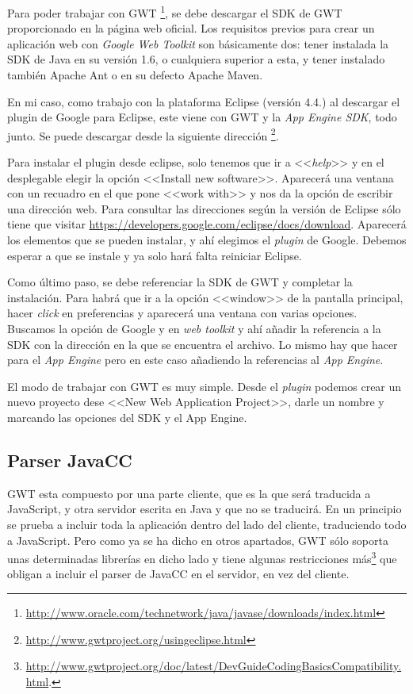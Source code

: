 Para poder trabajar con GWT \footnote{\url{http://www.oracle.com/technetwork/java/javase/downloads/index.html}}, se debe descargar el SDK de GWT proporcionado en la página web oficial. Los requisitos previos para crear un aplicación web con \emph{Google Web Toolkit} son básicamente dos: tener instalada la SDK de Java en su versión 1.6, o cualquiera superior a esta, y tener instalado también Apache Ant o en su defecto Apache Maven.

En mi caso, como trabajo con la plataforma Eclipse (versión 4.4.) al descargar el plugin de Google para Eclipse, este viene con GWT y la \emph{App Engine SDK}, todo junto. Se puede descargar desde la siguiente dirección \footnote{\url{http://www.gwtproject.org/usingeclipse.html}}.

Para instalar el plugin desde eclipse, solo tenemos que ir a <<\emph{help}>> y en el desplegable elegir la opción <<Install new software>>. Aparecerá una ventana con un recuadro en el que pone <<work with>> y nos da la opción de escribir una dirección web. Para consultar las direcciones según la versión de Eclipse sólo tiene que visitar \url{https://developers.google.com/eclipse/docs/download}.
Aparecerá los elementos que se pueden instalar, y ahí elegimos el \emph{plugin} de Google. Debemos esperar a que se instale y ya solo hará falta reiniciar Eclipse.

Como último paso, se debe referenciar la SDK de GWT y completar la instalación. Para habrá que ir a la opción <<window>> de la pantalla principal, hacer \emph{click} en preferencias y aparecerá una ventana con varias opciones. Buscamos la opción de Google y en \emph{web toolkit} y ahí añadir la referencia a la SDK con la dirección en la que se encuentra el archivo. Lo mismo hay que hacer para el \emph{App Engine} pero en este caso añadiendo la referencias al \emph{App Engine}.

El modo de trabajar con GWT es muy simple. Desde el \emph{plugin} podemos crear un nuevo proyecto dese <<New Web Application Project>>, darle un nombre y marcando las opciones del SDK y el App Engine.

 
\subsection{Parser JavaCC}

GWT esta compuesto por una parte cliente, que es la que será traducida a JavaScript, y otra servidor escrita en Java y que no se traducirá. En un principio se prueba a incluir toda la aplicación dentro del lado del cliente, traduciendo todo a JavaScript. Pero como ya se ha dicho en otros apartados, GWT sólo soporta unas determinadas librerías en dicho lado y tiene algunas restricciones más\footnote{\url{http://www.gwtproject.org/doc/latest/DevGuideCodingBasicsCompatibility.html}.} que obligan a incluir el parser de JavaCC en el servidor, en vez del cliente.

